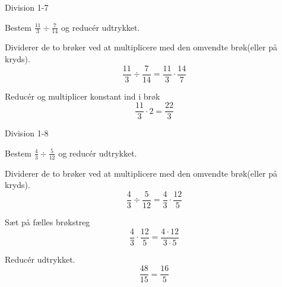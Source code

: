 \documentclass{article}
\begin{document}
\newpage

\begin{exercise}{Division 1-7}
	
	Bestem $\frac{11}{3} \div \frac{7}{14}$ og reducér udtrykket.
	
	
	\hint
	
	Dividerer de to brøker ved at multiplicere med den omvendte brøk(eller på kryds).
	\[
	\frac{11}{3} \div \frac{7}{14} = \frac{11}{3} \cdot \frac{14}{7}
	\]
	
	\hint
	
	Reducér og multiplicer konstant ind i brøk
	\[
	\frac{11}{3} \cdot 2 = \frac{22}{3} 
	\]
	
	
\end{exercise}

\newpage

\begin{exercise}{Division 1-8}
	
	Bestem $\frac{4}{3} \div \frac{5}{12}$ og reducér udtrykket.
	
	
	\hint
	
	Dividerer de to brøker ved at multiplicere med den omvendte brøk(eller på kryds).
	\[
	\frac{4}{3} \div \frac{5}{12} = \frac{4}{3} \cdot \frac{12}{5}
	\]
	
	\hint
	
	Sæt på fælles brøkstreg
	\[
	\frac{4}{3} \cdot \frac{12}{5} = \frac{4 \cdot 12}{3 \cdot 5}
	\]
	
	\hint
	
	Reducér udtrykket.
	\[
	\frac{48}{15} = \frac{16}{5} 
	\]
	
\end{exercise}
\end{document}
